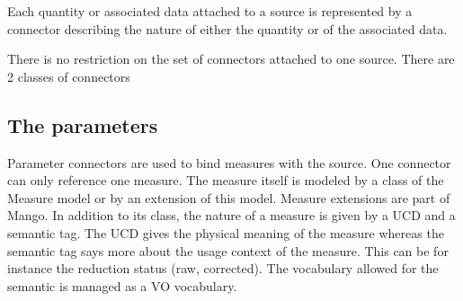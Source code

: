 \documentclass[11pt,a4paper]{ivoa}
\begin{document}
Each quantity or associated data attached to a source is represented by a connector describing the nature of either the quantity or of the associated data.

There is no restriction on the set of connectors attached to one source.
There are 2 classes of connectors

\subsection{The parameters} 
Parameter connectors are used to bind measures with the source. One connector can only reference one measure. The measure itself is modeled by a class of the Measure model or by an extension of this model. Measure extensions are part of Mango. 
In addition to its class, the nature of a measure is given by a UCD and a semantic tag. The UCD gives the physical meaning of the measure whereas the semantic tag says more about the usage context of the measure. This can be for instance the reduction status (raw, corrected). The vocabulary allowed for the semantic is managed as a VO vocabulary. 
\end{document}
